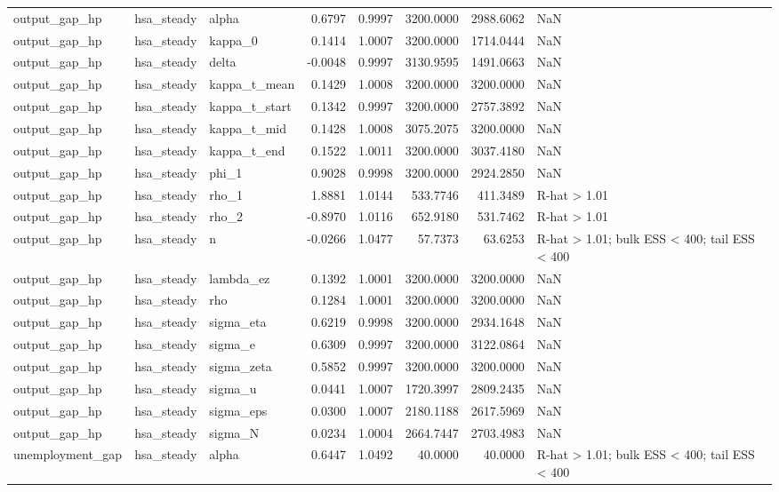 \begin{tabular}{lllrrrrl}
output\_gap\_hp & hsa\_steady & alpha & 0.6797 & 0.9997 & 3200.0000 & 2988.6062 & NaN \\
output\_gap\_hp & hsa\_steady & kappa\_0 & 0.1414 & 1.0007 & 3200.0000 & 1714.0444 & NaN \\
output\_gap\_hp & hsa\_steady & delta & -0.0048 & 0.9997 & 3130.9595 & 1491.0663 & NaN \\
output\_gap\_hp & hsa\_steady & kappa\_t\_mean & 0.1429 & 1.0008 & 3200.0000 & 3200.0000 & NaN \\
output\_gap\_hp & hsa\_steady & kappa\_t\_start & 0.1342 & 0.9997 & 3200.0000 & 2757.3892 & NaN \\
output\_gap\_hp & hsa\_steady & kappa\_t\_mid & 0.1428 & 1.0008 & 3075.2075 & 3200.0000 & NaN \\
output\_gap\_hp & hsa\_steady & kappa\_t\_end & 0.1522 & 1.0011 & 3200.0000 & 3037.4180 & NaN \\
output\_gap\_hp & hsa\_steady & phi\_1 & 0.9028 & 0.9998 & 3200.0000 & 2924.2850 & NaN \\
output\_gap\_hp & hsa\_steady & rho\_1 & 1.8881 & 1.0144 & 533.7746 & 411.3489 & R-hat > 1.01 \\
output\_gap\_hp & hsa\_steady & rho\_2 & -0.8970 & 1.0116 & 652.9180 & 531.7462 & R-hat > 1.01 \\
output\_gap\_hp & hsa\_steady & n & -0.0266 & 1.0477 & 57.7373 & 63.6253 & R-hat > 1.01; bulk ESS < 400; tail ESS < 400 \\
output\_gap\_hp & hsa\_steady & lambda\_ez & 0.1392 & 1.0001 & 3200.0000 & 3200.0000 & NaN \\
output\_gap\_hp & hsa\_steady & rho & 0.1284 & 1.0001 & 3200.0000 & 3200.0000 & NaN \\
output\_gap\_hp & hsa\_steady & sigma\_eta & 0.6219 & 0.9998 & 3200.0000 & 2934.1648 & NaN \\
output\_gap\_hp & hsa\_steady & sigma\_e & 0.6309 & 0.9997 & 3200.0000 & 3122.0864 & NaN \\
output\_gap\_hp & hsa\_steady & sigma\_zeta & 0.5852 & 0.9997 & 3200.0000 & 3200.0000 & NaN \\
output\_gap\_hp & hsa\_steady & sigma\_u & 0.0441 & 1.0007 & 1720.3997 & 2809.2435 & NaN \\
output\_gap\_hp & hsa\_steady & sigma\_eps & 0.0300 & 1.0007 & 2180.1188 & 2617.5969 & NaN \\
output\_gap\_hp & hsa\_steady & sigma\_N & 0.0234 & 1.0004 & 2664.7447 & 2703.4983 & NaN \\
unemployment\_gap & hsa\_steady & alpha & 0.6447 & 1.0492 & 40.0000 & 40.0000 & R-hat > 1.01; bulk ESS < 400; tail ESS < 400 \\

\end{tabular}
